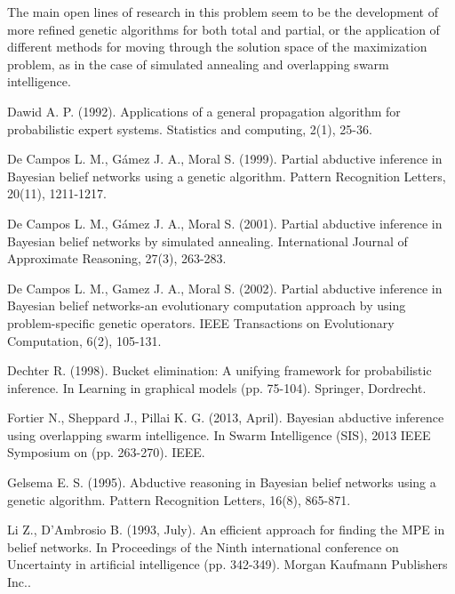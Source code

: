 \documentclass[a4paper,11pt]{article}
\begin{document}
The main open lines of research in this problem seem to be the development of more refined genetic algorithms for both total and partial, or the application of different methods for moving through the solution space of the maximization problem, as in the case of simulated annealing and overlapping swarm intelligence.


\begin{thebibliography}{}

Dawid A. P. (1992). Applications of a general propagation algorithm for probabilistic expert systems. Statistics and computing, 2(1), 25-36.

De Campos L. M., Gámez J. A., Moral S. (1999). Partial abductive inference in Bayesian belief networks using a genetic algorithm. Pattern Recognition Letters, 20(11), 1211-1217.

De Campos L. M., Gámez J. A., Moral S. (2001). Partial abductive inference in Bayesian belief networks by simulated annealing. International Journal of Approximate Reasoning, 27(3), 263-283.

De Campos L. M., Gamez J. A., Moral S. (2002). Partial abductive inference in Bayesian belief networks-an evolutionary computation approach by using problem-specific genetic operators. IEEE Transactions on Evolutionary Computation, 6(2), 105-131.

Dechter R. (1998). Bucket elimination: A unifying framework for probabilistic inference. In Learning in graphical models (pp. 75-104). Springer, Dordrecht.

Fortier N., Sheppard J., Pillai K. G. (2013, April). Bayesian abductive inference using overlapping swarm intelligence. In Swarm Intelligence (SIS), 2013 IEEE Symposium on (pp. 263-270). IEEE.

Gelsema E. S. (1995). Abductive reasoning in Bayesian belief networks using a genetic algorithm. Pattern Recognition Letters, 16(8), 865-871.

Li Z., D'Ambrosio B. (1993, July). An efficient approach for finding the MPE in belief networks. In Proceedings of the Ninth international conference on Uncertainty in artificial intelligence (pp. 342-349). Morgan Kaufmann Publishers Inc..


\end{thebibliography}
\end{document}
